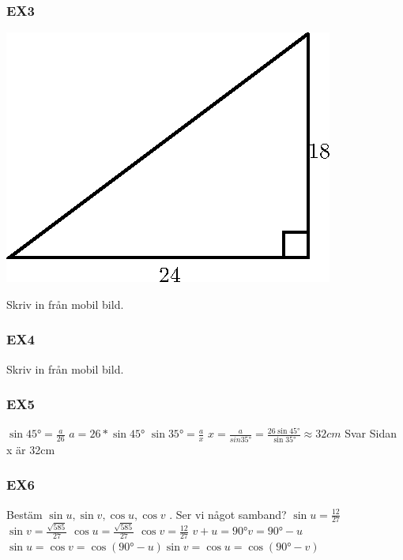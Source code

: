 \documentclass[a4paper,10pt]{article}
\begin{document}
\begin{flushleft}
    \subsubsection{EX3}
      \includegraphics{trigonometri2.eps}\newline

      Skriv in från mobil bild.
    \subsubsection{EX4}
      Skriv in från mobil bild.
    \subsubsection{EX5}
      $ \sin 45° = \frac{a}{26} $\newline
      $ a = 26*\sin 45° $\newline
      $ \sin 35° = \frac{a}{x} $\newline
      $ x = \frac{a}{sin35°} = \frac{26\sin 45°}{\sin 35°} \approx 32cm $\newline
      Svar Sidan x är 32cm
    \subsubsection{EX6}
      Bestäm $ \sin u, \sin v, \cos u, \cos v $ . Ser vi något samband?\newline
      $ \sin u = \frac{12}{27} $\newline
      $ \sin v = \frac{\sqrt{585}}{27} $\newline
      $ \cos u = \frac{\sqrt{585}}{27} $\newline
      $ \cos v = \frac{12}{27} $\newline
      $ v+u = 90°$\newline$ v = 90°-u $\newline$ \sin u = \cos v = \cos(90°-u)$\newline$ \sin v = \cos u = \cos(90°-v) $

\end{flushleft}
\end{document}
